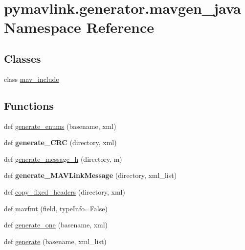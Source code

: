 \hypertarget{namespacepymavlink_1_1generator_1_1mavgen__java}{}\section{pymavlink.\+generator.\+mavgen\+\_\+java Namespace Reference}
\label{namespacepymavlink_1_1generator_1_1mavgen__java}
\subsection*{Classes}
\begin{DoxyCompactItemize}
\item 
class \hyperlink{classpymavlink_1_1generator_1_1mavgen__java_1_1mav__include}{mav\+\_\+include}
\end{DoxyCompactItemize}
\subsection*{Functions}
\begin{DoxyCompactItemize}
\item 
def \hyperlink{namespacepymavlink_1_1generator_1_1mavgen__java_a28c5498b088ff49d4396c50a899e12e5}{generate\+\_\+enums} (basename, xml)
\item 
\mbox{\label{namespacepymavlink_1_1generator_1_1mavgen__java_a813b049b70acedf90a39e62dd608bad7}} 
def {\bfseries generate\+\_\+\+C\+RC} (directory, xml)
\item 
def \hyperlink{namespacepymavlink_1_1generator_1_1mavgen__java_a724ccefca61f69197f6cdfde059d7274}{generate\+\_\+message\+\_\+h} (directory, m)
\item 
\mbox{\label{namespacepymavlink_1_1generator_1_1mavgen__java_a02449b086b78cf9462077c13ba63a2f0}} 
def {\bfseries generate\+\_\+\+M\+A\+V\+Link\+Message} (directory, xml\+\_\+list)
\item 
def \hyperlink{namespacepymavlink_1_1generator_1_1mavgen__java_ab7e11242a8e14499326d0ab7de04d9d1}{copy\+\_\+fixed\+\_\+headers} (directory, xml)
\item 
def \hyperlink{namespacepymavlink_1_1generator_1_1mavgen__java_a23f35fe059a4de4d3ebbd2e148f86931}{mavfmt} (field, type\+Info=False)
\item 
def \hyperlink{namespacepymavlink_1_1generator_1_1mavgen__java_a73c50060fdb0745de2d34d37c3b5c22c}{generate\+\_\+one} (basename, xml)
\item 
def \hyperlink{namespacepymavlink_1_1generator_1_1mavgen__java_a1c6932c354d39a0d5ce72d1d905a73ae}{generate} (basename, xml\+\_\+list)
\end{DoxyCompactItemize}
